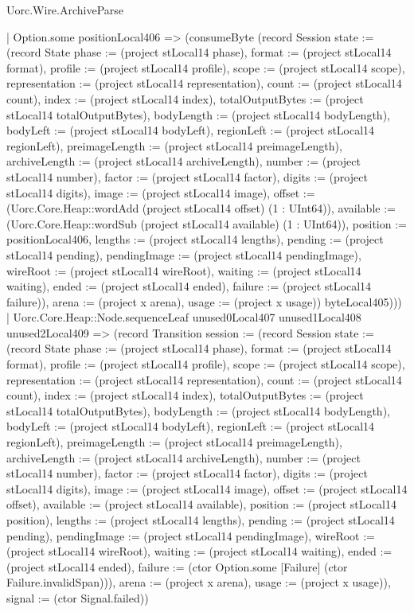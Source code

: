 \begin{lexlean}{Uorc.Wire.ArchiveParse}
\begin{semanticmodule}
{                | Option.some positionLocal406 => (consumeByte (record Session {state := (record State {phase := (project stLocal14 phase), format := (project stLocal14 format), profile := (project stLocal14 profile), scope := (project stLocal14 scope), representation := (project stLocal14 representation), count := (project stLocal14 count), index := (project stLocal14 index), totalOutputBytes := (project stLocal14 totalOutputBytes), bodyLength := (project stLocal14 bodyLength), bodyLeft := (project stLocal14 bodyLeft), regionLeft := (project stLocal14 regionLeft), preimageLength := (project stLocal14 preimageLength), archiveLength := (project stLocal14 archiveLength), number := (project stLocal14 number), factor := (project stLocal14 factor), digits := (project stLocal14 digits), image := (project stLocal14 image), offset := (Uorc.Core.Heap::wordAdd (project stLocal14 offset) (1 : UInt64)), available := (Uorc.Core.Heap::wordSub (project stLocal14 available) (1 : UInt64)), position := positionLocal406, lengths := (project stLocal14 lengths), pending := (project stLocal14 pending), pendingImage := (project stLocal14 pendingImage), wireRoot := (project stLocal14 wireRoot), waiting := (project stLocal14 waiting), ended := (project stLocal14 ended), failure := (project stLocal14 failure)}), arena := (project x arena), usage := (project x usage)}) byteLocal405)))
            | Uorc.Core.Heap::Node.sequenceLeaf unused0Local407 unused1Local408 unused2Local409 => (record Transition {session := (record Session {state := (record State {phase := (project stLocal14 phase), format := (project stLocal14 format), profile := (project stLocal14 profile), scope := (project stLocal14 scope), representation := (project stLocal14 representation), count := (project stLocal14 count), index := (project stLocal14 index), totalOutputBytes := (project stLocal14 totalOutputBytes), bodyLength := (project stLocal14 bodyLength), bodyLeft := (project stLocal14 bodyLeft), regionLeft := (project stLocal14 regionLeft), preimageLength := (project stLocal14 preimageLength), archiveLength := (project stLocal14 archiveLength), number := (project stLocal14 number), factor := (project stLocal14 factor), digits := (project stLocal14 digits), image := (project stLocal14 image), offset := (project stLocal14 offset), available := (project stLocal14 available), position := (project stLocal14 position), lengths := (project stLocal14 lengths), pending := (project stLocal14 pending), pendingImage := (project stLocal14 pendingImage), wireRoot := (project stLocal14 wireRoot), waiting := (project stLocal14 waiting), ended := (project stLocal14 ended), failure := (ctor Option.some [Failure] (ctor Failure.invalidSpan))}), arena := (project x arena), usage := (project x usage)}), signal := (ctor Signal.failed)})
}
\end{semanticmodule}
\end{lexlean}
